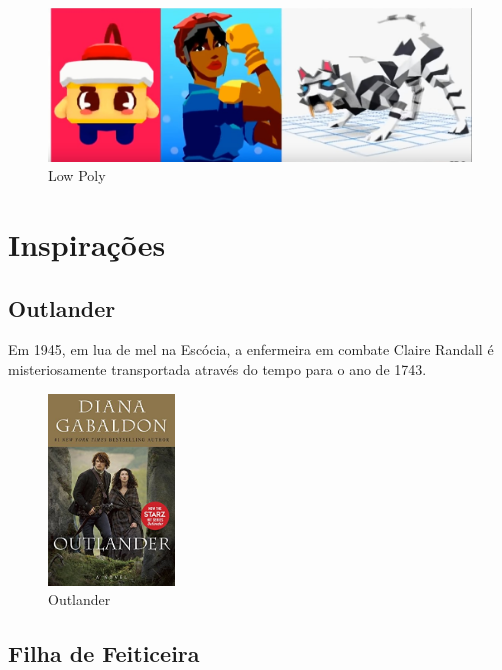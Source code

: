 \begin{figure}[!htb]
	\caption{\label{LowPoly}Low Poly}
	\begin{center}
	    \includegraphics[width=\textwidth]{imagens/lowPoly.jpg}
	\end{center}
\end{figure}


\clearpage
\section{Inspirações}

\subsection{Outlander}

Em 1945, em lua de mel na Escócia, a enfermeira em combate Claire Randall é misteriosamente transportada através do tempo para o ano de 1743.

\begin{figure}[!htb]
	\caption{\label{Outlander}Outlander}
	\begin{center}
	    \includegraphics[width=0.3\textwidth]{imagens/outlander.jpg}
	\end{center}
\end{figure}

\subsection{Filha de Feiticeira}

